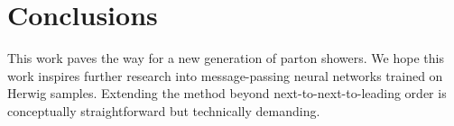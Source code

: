 \section{Conclusions}\label{sec:conclusions}

This work paves the way for a new generation of parton showers. We hope
this work inspires further research into message-passing neural networks
trained on Herwig samples. Extending the method beyond
next-to-next-to-leading order is conceptually straightforward but
technically demanding.

